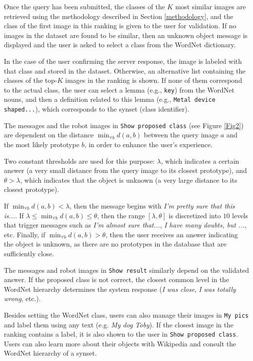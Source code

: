 \documentclass[final, twocolumn]{elsarticle}
\begin{document}
Once the query has been submitted, the classes of the $K$ most similar images are retrieved using the methodology described in Section \ref{methodology}, and the class of the first image in this ranking is given to the user for validation. If no images in the dataset are found to be similar, then an unknown object message is displayed and the user is asked to select a class from the WordNet dictionary. 

In the case of the user confirming the server response, the image is labeled with that class and stored in the dataset. Otherwise, an alternative list containing the classes of the top-$K$ images in the ranking is shown. If none of them correspond to the actual class, the user can select a lemma (e.g., \texttt{key}) from the WordNet nouns, and then a definition related to this lemma (e.g.,  \texttt{Metal device shaped...}), which corresponds to the synset (class identifier). 

The messages and the robot images in \texttt{Show proposed class} (see Figure \ref{Fig2}) are dependent on the distance $\min_{\forall{b}} {d(a,b)}$ between the query image $a$ and the most likely prototype $b$, in order to enhance the user’s experience. 

Two constant thresholds are used for this purpose: $\lambda$, which indicates a certain answer (a very small distance from the query image to its closest prototype), and  $\theta>\lambda$, which indicates that the object is unknown (a very large distance to its closest prototype). 

If $\min_{\forall{b}} {d(a,b)} < \lambda$, then the message begins with \textit{I'm pretty sure that this is...}. If $ \lambda \le \min_{\forall{b}}{d(a,b)} \le \theta$, then the range $[\lambda, \theta]$ is discretized into $10$ levels that trigger messages such as \textit{I'm almost sure that...}, \textit{I have many doubts, but ...}, etc. Finally, if $\min_{\forall{b}} {d(a,b)} > \theta$, then the user receives an answer indicating the object is unknown, as there are no prototypes in the database  that are sufficiently close.

The messages and robot images in \texttt{Show result} similarly depend on the validated answer. If the proposed class is not correct, the closest common level in the WordNet hierarchy determines the system response (\textit{I was close}, \textit{I was totally wrong}, etc.). 

Besides setting the WordNet class, users can also manage their images in \texttt{My pics} and label them using any text (e.g. \textit{My dog Toby}).  If the closest image in the ranking contains a label, it is also shown to the user in \texttt{Show proposed class}. Users can also learn more about their objects with Wikipedia and consult the WordNet hierarchy of a synset.
\end{document}
